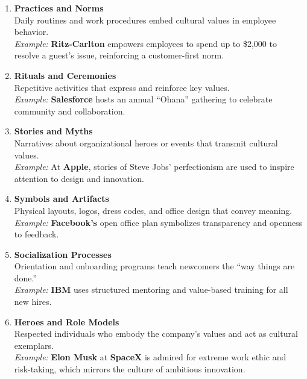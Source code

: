 \documentclass[10pt,a4paper]{book}
\begin{document}
\begin{enumerate}
    \item \textbf{Practices and Norms} \\
    Daily routines and work procedures embed cultural values in employee behavior. \\
    \textit{Example:} \textbf{Ritz-Carlton} empowers employees to spend up to \$2,000 to resolve a guest’s issue, reinforcing a customer-first norm.

    \item \textbf{Rituals and Ceremonies} \\
    Repetitive activities that express and reinforce key values. \\
    \textit{Example:} \textbf{Salesforce} hosts an annual “Ohana” gathering to celebrate community and collaboration.

    \item \textbf{Stories and Myths} \\
    Narratives about organizational heroes or events that transmit cultural values. \\
    \textit{Example:} At \textbf{Apple}, stories of Steve Jobs’ perfectionism are used to inspire attention to design and innovation.

    \item \textbf{Symbols and Artifacts} \\
    Physical layouts, logos, dress codes, and office design that convey meaning. \\
    \textit{Example:} \textbf{Facebook’s} open office plan symbolizes transparency and openness to feedback.

    \item \textbf{Socialization Processes} \\
    Orientation and onboarding programs teach newcomers the “way things are done.” \\
    \textit{Example:} \textbf{IBM} uses structured mentoring and value-based training for all new hires.

    \item \textbf{Heroes and Role Models} \\
    Respected individuals who embody the company’s values and act as cultural exemplars. \\
    \textit{Example:} \textbf{Elon Musk} at \textbf{SpaceX} is admired for extreme work ethic and risk-taking, which mirrors the culture of ambitious innovation.
\end{enumerate}
\end{document}
